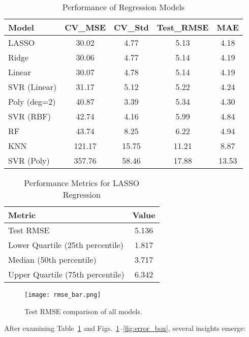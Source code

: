 \documentclass[conference]{IEEEtran}
\begin{document}
\begin{table}[htbp]\footnotesize
  \caption{Performance of Regression Models}
  \label{tab:perf}
  \centering
  \begin{tabular}{|l|c|c|c|c|}
    \hline
    Model & CV\_MSE & CV\_Std & Test\_RMSE & MAE \\
    \hline
    LASSO                   & 30.02 & 4.77 & 5.13  & 4.18 \\
    Ridge                   & 30.06 & 4.77 & 5.14  & 4.19 \\
    Linear                  & 30.07 & 4.78 & 5.14  & 4.19 \\
    SVR (Linear)            & 31.17 & 5.12 & 5.22  & 4.24 \\
    Poly (deg=2)            & 40.87 & 3.39 & 5.34  & 4.30 \\
    SVR (RBF)               & 42.74 & 4.16 & 5.99  & 4.84 \\
    RF                      & 43.74 & 8.25 & 6.22  & 4.94 \\
    KNN                     &121.17 &15.75 &11.21  & 8.87 \\
    SVR (Poly)              &357.76 &58.46 &17.88  &13.53 \\
    \hline
  \end{tabular}
\end{table}
\begin{table}[htbp]
  \caption{Performance Metrics for LASSO Regression}
  \label{tab:LASSO_metrics}
  \centering
  \begin{tabular}{|l|c|}
    \hline
    \textbf{Metric} & \textbf{Value} \\
    \hline
    Test RMSE                        & 5.136 \\
    Lower Quartile (25th percentile) & 1.817 \\
    Median (50th percentile)         & 3.717 \\
    Upper Quartile (75th percentile) & 6.342 \\
    \hline
  \end{tabular}
\end{table}


\begin{figure}[htbp]
  \centering
  \texttt{[image: rmse\_bar.png]}
  \caption{Test RMSE comparison of all models.}
  \label{fig:rmse_bar}
\end{figure}
After examining Table~\ref{tab:perf} and Figs.~\ref{fig:rmse_bar}–\ref{fig:error_box}, several insights emerge:
\end{document}

